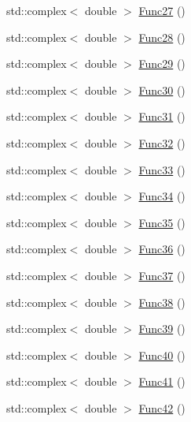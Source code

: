 \begin{DoxyCompactItemize}
\item 
std\-::complex$<$ double $>$ \hyperlink{classosea_1_1ofreq_1_1_eqn_rotation_a36e192f8dde729d8d87f4652ff734476}{Func27} ()
\item 
std\-::complex$<$ double $>$ \hyperlink{classosea_1_1ofreq_1_1_eqn_rotation_aa3805d0928e956605a1eb23782896abb}{Func28} ()
\item 
std\-::complex$<$ double $>$ \hyperlink{classosea_1_1ofreq_1_1_eqn_rotation_a5b285daab569e0df299c8785b7b5c196}{Func29} ()
\item 
std\-::complex$<$ double $>$ \hyperlink{classosea_1_1ofreq_1_1_eqn_rotation_ad161dda2f5dbce69e09d76254b7acff1}{Func30} ()
\item 
std\-::complex$<$ double $>$ \hyperlink{classosea_1_1ofreq_1_1_eqn_rotation_ac77925b7ba17fe5815623aea207157f3}{Func31} ()
\item 
std\-::complex$<$ double $>$ \hyperlink{classosea_1_1ofreq_1_1_eqn_rotation_ae4b35cf8026345a83e13b741d83296ad}{Func32} ()
\item 
std\-::complex$<$ double $>$ \hyperlink{classosea_1_1ofreq_1_1_eqn_rotation_a08c103713ef069bef3a3dbde86880002}{Func33} ()
\item 
std\-::complex$<$ double $>$ \hyperlink{classosea_1_1ofreq_1_1_eqn_rotation_aad660fc66128d3ea7fe98c3664ca0a9d}{Func34} ()
\item 
std\-::complex$<$ double $>$ \hyperlink{classosea_1_1ofreq_1_1_eqn_rotation_a4aaf7d3f70512054c26b97a536cd7350}{Func35} ()
\item 
std\-::complex$<$ double $>$ \hyperlink{classosea_1_1ofreq_1_1_eqn_rotation_ac69f0afdf8909091d194aa18794befb9}{Func36} ()
\item 
std\-::complex$<$ double $>$ \hyperlink{classosea_1_1ofreq_1_1_eqn_rotation_af68e73dbe1bc25da22ce7cf7a7fe8a01}{Func37} ()
\item 
std\-::complex$<$ double $>$ \hyperlink{classosea_1_1ofreq_1_1_eqn_rotation_a9a2e00507824c40c91ea0d8ca573fdfb}{Func38} ()
\item 
std\-::complex$<$ double $>$ \hyperlink{classosea_1_1ofreq_1_1_eqn_rotation_a6459d16f3c0a4597c8be5fea8bd81283}{Func39} ()
\item 
std\-::complex$<$ double $>$ \hyperlink{classosea_1_1ofreq_1_1_eqn_rotation_a232e034c66d9d143b9879a60207b7437}{Func40} ()
\item 
std\-::complex$<$ double $>$ \hyperlink{classosea_1_1ofreq_1_1_eqn_rotation_a6798d30551f1e7a19401991e0939c2d1}{Func41} ()
\item 
std\-::complex$<$ double $>$ \hyperlink{classosea_1_1ofreq_1_1_eqn_rotation_a64ac7e509a83668e26fe93d1caf96f70}{Func42} ()

\end{DoxyCompactItemize}
